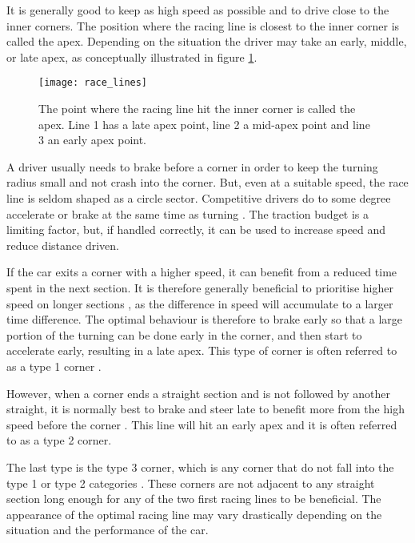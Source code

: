 It is generally good to keep as high speed as possible and to drive close to the inner corners. The position where the racing line is closest to the inner corner is called the apex. Depending on the situation the driver may take an early, middle, or late apex, as conceptually illustrated in figure \ref{figure:apex_variants}.

\begin{figure}[H]
    \centering
    \texttt{[image: race\_lines]}
    \caption{The point where the racing line hit the inner corner is called the apex. Line 1 has a late apex point, line 2 a mid-apex point and line 3 an early apex point.}
    \label{figure:apex_variants}
\end{figure}

\noindent
A driver usually needs to brake before a corner in order to keep the turning radius small and not crash into the corner. But, even at a suitable speed, the race line is seldom shaped as a circle sector. Competitive drivers do to some degree accelerate or brake at the same time as turning \cite{edmondson}. The traction budget is a limiting factor, but, if handled correctly, it can be used to increase speed and reduce distance driven. 

If the car exits a corner with a higher speed, it can benefit from a reduced time spent in the next section. It is therefore generally beneficial to prioritise higher speed on longer sections \cite{beckman, edmondson}, as the difference in speed will accumulate to a larger time difference. The optimal behaviour is therefore to brake early so that a large portion of the turning can be done early in the corner, and then start to accelerate early, resulting in a late apex. This type of corner is often referred to as a type 1 corner \cite{edmondson}.

However, when a corner ends a straight section and is not followed by another straight, it is normally best to brake and steer late to benefit more from the high speed before the corner \cite{edmondson}. This line will hit an early apex and it is often referred to as a type 2 corner.

The last type is the type 3 corner, which is any corner that do not fall into the type 1 or type 2 categories \cite{edmondson}. These corners are not adjacent to any straight section long enough for any of the two first racing lines to be beneficial. The appearance of the optimal racing line may vary drastically depending on the situation and the performance of the car.

